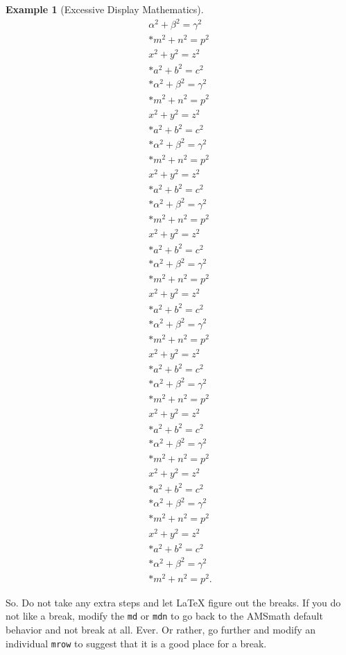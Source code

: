 \documentclass[10pt,]{article}
\theoremstyle{plain}
\theoremstyle{definition}
\theoremstyle{definition}
\theoremstyle{definition}
\theoremstyle{definition}
\newtheorem{example}[theorem]{Example}
\theoremstyle{definition}
\theoremstyle{definition}
\numberwithin{equation}{section}
\begin{document}
\begin{example}[Excessive Display Mathematics]
\begin{gather}
\alpha^2+\beta^2=\gamma^2\label{mrow-96}\\*
m^2+n^2=p^2\label{mrow-97}\\
x^2+y^2=z^2\label{mrow-98}\\*
a^2+b^2=c^2\label{mrow-99}\\*
\alpha^2+\beta^2=\gamma^2\label{mrow-100}\\*
m^2+n^2=p^2\label{mrow-101}\\
x^2+y^2=z^2\label{mrow-102}\\*
a^2+b^2=c^2\label{mrow-103}\\*
\alpha^2+\beta^2=\gamma^2\label{mrow-104}\\*
m^2+n^2=p^2\label{mrow-105}\\
x^2+y^2=z^2\label{mrow-106}\\*
a^2+b^2=c^2\label{mrow-107}\\*
\alpha^2+\beta^2=\gamma^2\label{mrow-108}\\*
m^2+n^2=p^2\label{mrow-109}\\
x^2+y^2=z^2\label{mrow-110}\\*
a^2+b^2=c^2\label{mrow-111}\\*
\alpha^2+\beta^2=\gamma^2\label{mrow-112}\\*
m^2+n^2=p^2\label{mrow-113}\\
x^2+y^2=z^2\label{mrow-114}\\*
a^2+b^2=c^2\label{mrow-115}\\*
\alpha^2+\beta^2=\gamma^2\label{mrow-116}\\*
m^2+n^2=p^2\label{mrow-117}\\
x^2+y^2=z^2\label{mrow-118}\\*
a^2+b^2=c^2\label{mrow-119}\\*
\alpha^2+\beta^2=\gamma^2\label{mrow-120}\\*
m^2+n^2=p^2\label{mrow-121}\\
x^2+y^2=z^2\label{mrow-122}\\*
a^2+b^2=c^2\label{mrow-123}\\*
\alpha^2+\beta^2=\gamma^2\label{mrow-124}\\*
m^2+n^2=p^2\label{mrow-125}\\
x^2+y^2=z^2\label{mrow-126}\\*
a^2+b^2=c^2\label{mrow-127}\\*
\alpha^2+\beta^2=\gamma^2\label{mrow-128}\\*
m^2+n^2=p^2\label{mrow-129}\\
x^2+y^2=z^2\label{mrow-130}\\*
a^2+b^2=c^2\label{mrow-131}\\*
\alpha^2+\beta^2=\gamma^2\label{mrow-132}\\*
m^2+n^2=p^2\text{.}\label{mrow-133}
\end{gather}
%
\par
\hypertarget{p-188}{}%
So.  Do not take any extra steps and let \LaTeX{} figure out the breaks.  If you do not like a break, modify the \lstinline?md? or \lstinline?mdn? to go back to the AMSmath default behavior and not break at all.  Ever.  Or rather, go further and modify an individual \lstinline?mrow? to suggest that it is a good place for a break.%
\end{example}
\end{document}
